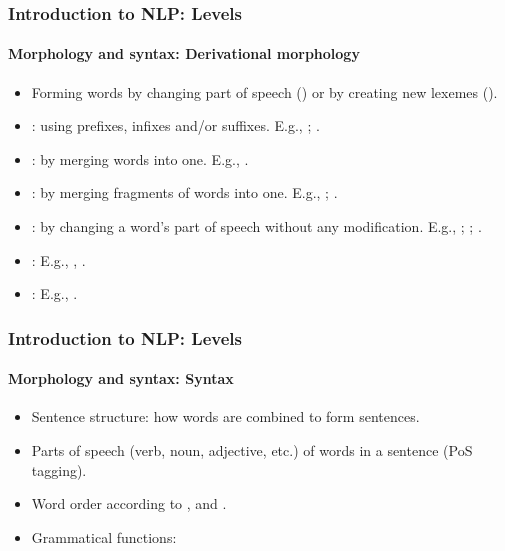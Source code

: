 \documentclass[xcolor=table]{beamer}
\begin{document}
\begin{frame}
\frametitle{Introduction to NLP: Levels}
\framesubtitle{Morphology and syntax: Derivational morphology}


\begin{itemize}
	\item Forming words by changing part of speech () or by creating new lexemes ().
	
	\item {}: using prefixes, infixes and/or suffixes. 
	E.g., ; .
	
	\item {}: by merging words into one.
	E.g., .
	
	\item {}: by merging fragments of words into one.
	E.g., ; .
	
	\item {}: by changing a word's part of speech without any modification. 
	E.g., ; ; .
	
	\item {}:
	E.g., , .
	
	\item {}: E.g., .
	
\end{itemize}

\end{frame}

\begin{frame}
\frametitle{Introduction to NLP: Levels}
\framesubtitle{Morphology and syntax: Syntax}

\begin{itemize}
	\item Sentence structure: how words are combined to form sentences.
	\item Parts of speech (verb, noun, adjective, etc.) of words in a sentence (PoS tagging).
	\item Word order according to ,  and .
	\item Grammatical functions: 
\end{itemize}

\end{frame}
\end{document}
